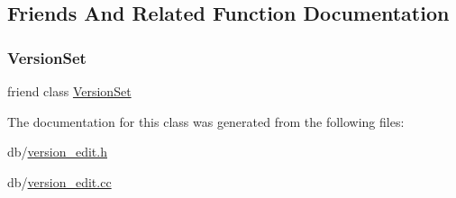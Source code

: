 \subsection{Friends And Related Function Documentation}
\mbox{\label{classleveldb_1_1_version_edit_a1827cd1b4d6e9e3c378ce37ca3cce635}} 
\subsubsection{\texorpdfstring{VersionSet}{VersionSet}}
{\footnotesize\ttfamily friend class \mbox{\hyperlink{classleveldb_1_1_version_set}{Version\+Set}}\hspace{0.3cm}{\ttfamily [friend]}}



The documentation for this class was generated from the following files\+:\begin{DoxyCompactItemize}
\item 
db/\mbox{\hyperlink{version__edit_8h}{version\+\_\+edit.\+h}}\item 
db/\mbox{\hyperlink{version__edit_8cc}{version\+\_\+edit.\+cc}}\end{DoxyCompactItemize}
